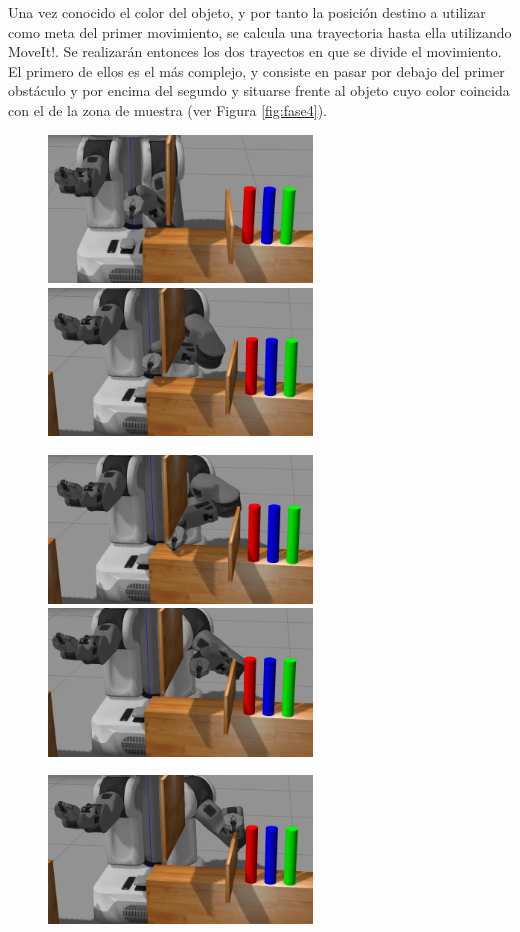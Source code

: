 \documentclass[12pt,spanish,chapterprefix, numbers=noenddot]{book}
\numberwithin{equation}{section}
\numberwithin{figure}{section}
\begin{document}
Una vez conocido el color del objeto, y por tanto la posición destino a utilizar como meta del primer movimiento, se calcula una trayectoria hasta ella utilizando MoveIt!. Se realizarán entonces los dos trayectos en que se divide el movimiento. El primero de ellos es el más complejo, y consiste en pasar por debajo del primer obstáculo y por encima del segundo y situarse frente al objeto cuyo color coincida con el de la zona de muestra (ver Figura \ref{fig:fase4}). 

\begin{figure}[hbt!]
\centering
\includegraphics[width=7cm]{Figs/fase3_1.png}
\includegraphics[width=7cm]{Figs/fase3_2.png}
\par
\centering
\includegraphics[width=7cm]{Figs/fase3_3.png}
\includegraphics[width=7cm]{Figs/fase3_4.png}
\par
\centering
\includegraphics[width=7cm]{Figs/fase3_5.png}

\end{figure}
\end{document}

